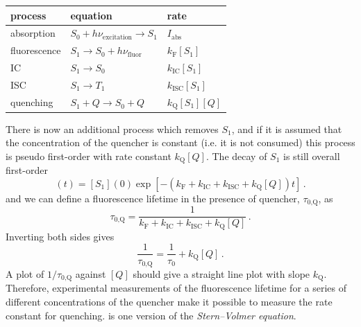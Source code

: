 \documentclass{article}
\theoremstyle{plain}\theoremheaderfont{\normalfont\itshape}\theorembodyfont{\rmfamily}\theoremseparator{.}\newtheorem*{rem}{Remark}\newtheorem*{ex}{Example}\newtheorem*{proof}{Proof}\newtheorem*{altp}{Alternative proof}
\theoremstyle{plain}\theoremheaderfont{\normalfont\bfseries}\theorembodyfont{\rmfamily}\theoremseparator{.}\newtheorem{thm}{Theorem}[section]\newtheorem{lem}[thm]{Lemma}\newtheorem{prop}[thm]{Proposition}\newtheorem*{cor}{Corollary}\newtheorem{defn}[thm]{Definition}\newtheorem{clm}[thm]{Claim}\newtheorem{clminproof}{Claim}\newtheorem{pos}{Postulate}[section]
\theoremstyle{break}\theoremheaderfont{\normalfont\itshape}\theorembodyfont{\rmfamily}\theoremseparator{.\medskip}\newtheorem*{proofskip}{Proof}\newtheorem*{exs}{Examples}\newtheorem*{rems}{Remarks}
\theoremstyle{break}\theoremheaderfont{\normalfont\bfseries}\theorembodyfont{\rmfamily}\theoremseparator{.\medskip}\newtheorem{lemskip}[thm]{Lemma}\newtheorem{defnskip}[thm]{Definition}\newtheorem{propskip}[thm]{Proposition}\newtheorem{thmskip}[thm]{Theorem}
\numberwithin{equation}{section}
\newcommand{\FF}{_{\text{F}}}
\newcommand{\IC}{_{\text{IC}}}
\newcommand{\ISC}{_{\text{ISC}}}
\newcommand{\QQ}{_{\text{Q}}}
\newcommand{\zeroQ}{_{\text{0,Q}}}
\begin{document}
    \begin{table}
        \centering
        \begin{tabular}{lll}
            \toprule
            process & equation & rate \\ \midrule
            absorption & \(S_0+h\nu_{\text{excitation}}\to S_1\) & \(I_{\text{abs}}\) \\
            fluorescence & \(S_1\to S_0+h\nu_{\text{fluor}}\) & \(k\FF[S_1]\) \\
            IC & \(S_1\to S_0\) & \(k\IC[S_1]\) \\
            ISC & \(S_1\to T_1\) & \(k\ISC[S_1]\) \\
            quenching & \(S_1+Q\to S_0+Q\) & \(k\QQ[S_1][Q]\) \\ \bottomrule
        \end{tabular}
    \end{table}

    There is now an additional process which removes \(S_1\), and if it is assumed that the concentration of the quencher is constant (i.e. it is not consumed) this process is pseudo first-order with rate constant \(k\QQ[Q]\). The decay of \(S_1\) is still overall first-order
    \begin{equation}
        [S_1](t)=[S_1](0)\exp\left[-(k\FF+k\IC+k\ISC+k\QQ[Q])t\right]\,.
    \end{equation}
    and we can define a fluorescence lifetime in the presence of quencher, \(\tau\zeroQ\), as
    \begin{equation}
        \tau\zeroQ=\frac{1}{k\FF+k\IC+k\ISC+k\QQ[Q]}\,.
    \end{equation}
    Inverting both sides gives
    \begin{equation}\label{Stern_Volmer}
        \frac{1}{\tau\zeroQ}=\frac{1}{\tau_0}+k\QQ[Q]\,.
    \end{equation}
    A plot of \(1/\tau\zeroQ\) against \([Q]\) should give a straight line plot with slope \(k\QQ\). Therefore, experimental measurements of the fluorescence lifetime for a series of different concentrations of the quencher make it possible to measure the rate constant for quenching.  is one version of the \textit{Stern--Volmer equation}.
\end{document}
